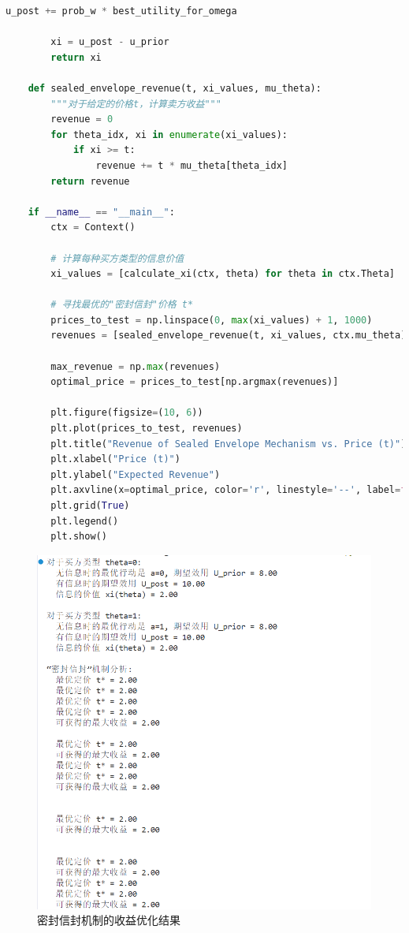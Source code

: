 \begin{lstlisting}[language=Python,style=pythonstyle]
            u_post += prob_w * best_utility_for_omega
    
        xi = u_post - u_prior
        return xi
    
    def sealed_envelope_revenue(t, xi_values, mu_theta):
        """对于给定的价格t，计算卖方收益"""
        revenue = 0
        for theta_idx, xi in enumerate(xi_values):
            if xi >= t:
                revenue += t * mu_theta[theta_idx]
        return revenue
    
    if __name__ == "__main__":
        ctx = Context()
        
        # 计算每种买方类型的信息价值
        xi_values = [calculate_xi(ctx, theta) for theta in ctx.Theta]
        
        # 寻找最优的"密封信封"价格 t*
        prices_to_test = np.linspace(0, max(xi_values) + 1, 1000)
        revenues = [sealed_envelope_revenue(t, xi_values, ctx.mu_theta) for t in prices_to_test]
        
        max_revenue = np.max(revenues)
        optimal_price = prices_to_test[np.argmax(revenues)]
    
        plt.figure(figsize=(10, 6))
        plt.plot(prices_to_test, revenues)
        plt.title("Revenue of Sealed Envelope Mechanism vs. Price (t)")
        plt.xlabel("Price (t)")
        plt.ylabel("Expected Revenue")
        plt.axvline(x=optimal_price, color='r', linestyle='--', label=f'Optimal Price t* = {optimal_price:.2f}')
        plt.grid(True)
        plt.legend()
        plt.show()    
\end{lstlisting}

\begin{figure}[H]
    \centering
    \includegraphics[width=0.6\linewidth]{image15.png}
    \caption{密封信封机制的收益优化结果}
    \label{fig:result}
\end{figure}

